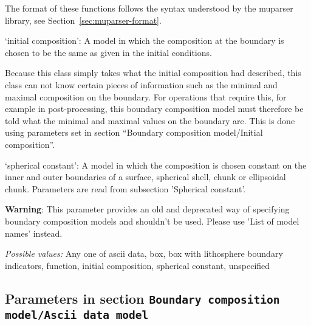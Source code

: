 \begin{itemize}
The format of these functions follows the syntax understood by the muparser library, see Section~\ref{sec:muparser-format}.

`initial composition': A model in which the composition at the boundary is chosen to be the same as given in the initial conditions.

Because this class simply takes what the initial composition had described, this class can not know certain pieces of information such as the minimal and maximal composition on the boundary. For operations that require this, for example in post-processing, this boundary composition model must therefore be told what the minimal and maximal values on the boundary are. This is done using parameters set in section ``Boundary composition model/Initial composition''.

`spherical constant': A model in which the composition is chosen constant on the inner and outer boundaries of a surface, spherical shell, chunk or ellipsoidal chunk. Parameters are read from subsection 'Spherical constant'.

\textbf{Warning}: This parameter provides an old and deprecated way of specifying boundary composition models and shouldn't be used. Please use 'List of model names' instead.


{\it Possible values:} Any one of ascii data, box, box with lithosphere boundary indicators, function, initial composition, spherical constant, unspecified
\end{itemize}



\subsection{Parameters in section \tt Boundary composition model/Ascii data model}
\label{parameters:Boundary_20composition_20model/Ascii_20data_20model}

